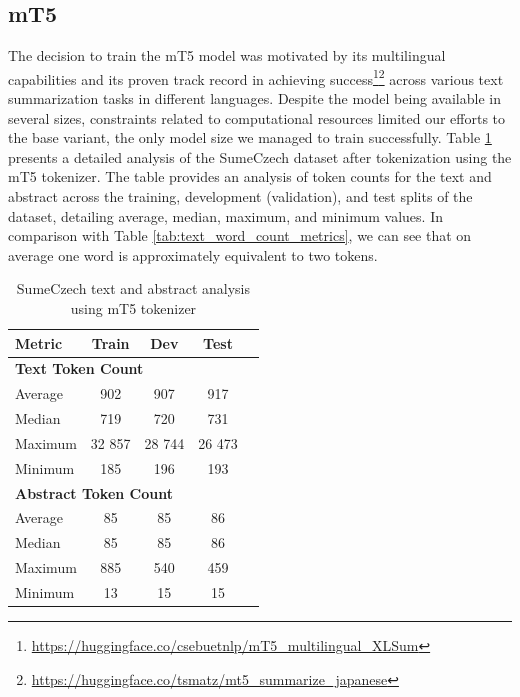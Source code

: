 \documentclass[english, ba, kiv, he, iso690numb, pdf, viewonly]{fasthesis}
\begin{document}
\subsection{mT5} \label{impl:mt5}
The decision to train the mT5 model was motivated by its multilingual capabilities and its proven track record in achieving success\footnote{\url{https://huggingface.co/csebuetnlp/mT5_multilingual_XLSum}}\footnote{\url{https://huggingface.co/tsmatz/mt5_summarize_japanese}} across various text summarization tasks in different languages. Despite the model being available in several sizes, constraints related to computational resources limited our efforts to the base variant, the only model size we managed to train successfully. Table \ref{tab:tokenized_text_abstract_metrics} presents a detailed analysis of the SumeCzech dataset after tokenization using the mT5 tokenizer. The table provides an analysis of token counts for the text and abstract across the training, development (validation), and test splits of the dataset, detailing average, median, maximum, and minimum values. In comparison with Table \ref{tab:text_word_count_metrics}, we can see that on average one word is approximately equivalent to two tokens.

\begin{table}[htbp]
	\centering
	\caption{SumeCzech text and abstract analysis using mT5 tokenizer}
	\label{tab:tokenized_text_abstract_metrics}
	\begin{tabular}{lcccc}
		\toprule
		\textbf{Metric} & {\textbf{Train}} & {\textbf{Dev}} & {\textbf{Test}} \\
		\midrule
		\multicolumn{4}{l}{\textbf{Text Token Count}} \\
		\midrule
		Average & 902 & 907 & 917 \\
		Median & 719 & 720 & 731 \\
		Maximum & 32 857 & 28 744 & 26 473 \\
		Minimum & 185 & 196 & 193 \\
		\midrule
		\multicolumn{4}{l}{\textbf{Abstract Token Count}} \\
		\midrule
		Average & 85 & 85 & 86 \\
		Median & 85 & 85 & 86 \\
		Maximum & 885 & 540 & 459 \\
		Minimum & 13 & 15 & 15 \\
		\bottomrule
	\end{tabular}
\end{table}
\end{document}

